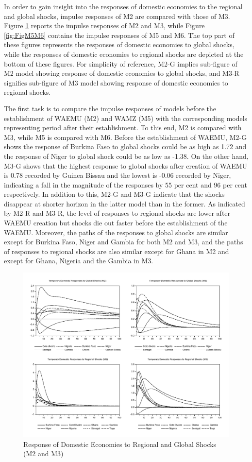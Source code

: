 \documentclass[]{article}
\begin{document}
In order to gain insight into the responses of domestic economies to the regional and global shocks, impulse responses of M2 are compared with those of M3. Figure \ref{fig:FigM2M3} reports the impulse responses of M2 and M3, while Figure \ref{fig:FigM5M6} contains the impulse responses of M5 and M6. The top part of these figures represents the responses of domestic economies to global shocks, while the responses of domestic economies to regional shocks are depicted at the bottom of these figures. For simplicity of reference, M2-G implies sub-figure of M2 model showing response of domestic economies to global shocks, and M3-R signifies sub-figure of M3 model showing response of domestic economies to regional shocks.

The first task is to compare the impulse responses of models before the establishment of WAEMU (M2) and WAMZ (M5) with the corresponding models representing period after their establishment. To this end, M2 is compared with M3, while M5 is compared with M6. Before the establishment of WAEMU, M2-G shows the response of Burkina Faso to global shocks could be as high as 1.72 and the response of Niger to global shock could be as low as -1.38. On the other hand, M3-G shows that the highest response to global shocks after creation of WAEMU is 0.78 recorded by Guinea Bissau and the lowest is -0.06 recorded by Niger, indicating a fall in the magnitude of the responses by 55 per cent and 96 per cent respectively. In addition to this, M2-G and M3-G indicate that the shocks disappear at shorter horizon in the latter model than in the former. As indicated by M2-R and M3-R, the level of responses to regional shocks are lower after WAEMU creation but shocks die out faster before the establishment of the WAEMU. Moreover, the paths of the responses to global shocks are similar except for Burkina Faso, Niger and Gambia for both M2 and M3, and the paths of responses to regional shocks are also similar except for Ghana in M2 and except for Ghana, Nigeria and the Gambia in M3.

\begin{figure}[ht!]
\includegraphics[width=0.98\linewidth,height=0.9\textheight]{FIGURES/figure1} \caption{Response of Domestic Economies to Regional and Global Shocks (M2 and M3)}\label{fig:FigM2M3}
\end{figure}
\end{document}
